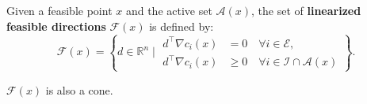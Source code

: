 \begin{definition}
    Given a feasible point $x$ and the active set $\mathcal{A}(x)$, the set of \textbf{linearized feasible directions} $\mathcal{F}(x)$ is defined by:
    \begin{equation}
        \mathcal{F}(x) = \left\{ d \in \mathbb{R}^n \mid 
        \begin{aligned}
            d^\top \nabla c_i(x) &= 0 \quad \forall i \in \mathcal{E}, \\
            d^\top \nabla c_i(x) &\ge 0 \quad \forall i \in \mathcal{I} \cap \mathcal{A}(x)
        \end{aligned}
        \right\}.
    \end{equation}
\end{definition}

\begin{remarque}
    $\mathcal{F}(x)$ is also a cone.
\end{remarque}

